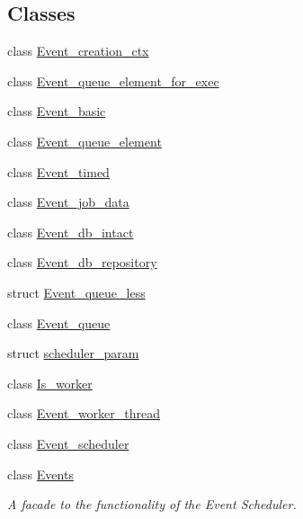 \subsection*{Classes}
\begin{DoxyCompactItemize}
\item 
class \mbox{\hyperlink{classEvent__creation__ctx}{Event\+\_\+creation\+\_\+ctx}}
\item 
class \mbox{\hyperlink{classEvent__queue__element__for__exec}{Event\+\_\+queue\+\_\+element\+\_\+for\+\_\+exec}}
\item 
class \mbox{\hyperlink{classEvent__basic}{Event\+\_\+basic}}
\item 
class \mbox{\hyperlink{classEvent__queue__element}{Event\+\_\+queue\+\_\+element}}
\item 
class \mbox{\hyperlink{classEvent__timed}{Event\+\_\+timed}}
\item 
class \mbox{\hyperlink{classEvent__job__data}{Event\+\_\+job\+\_\+data}}
\item 
class \mbox{\hyperlink{classEvent__db__intact}{Event\+\_\+db\+\_\+intact}}
\item 
class \mbox{\hyperlink{classEvent__db__repository}{Event\+\_\+db\+\_\+repository}}
\item 
struct \mbox{\hyperlink{structEvent__queue__less}{Event\+\_\+queue\+\_\+less}}
\item 
class \mbox{\hyperlink{classEvent__queue}{Event\+\_\+queue}}
\item 
struct \mbox{\hyperlink{structscheduler__param}{scheduler\+\_\+param}}
\item 
class \mbox{\hyperlink{classIs__worker}{Is\+\_\+worker}}
\item 
class \mbox{\hyperlink{classEvent__worker__thread}{Event\+\_\+worker\+\_\+thread}}
\item 
class \mbox{\hyperlink{classEvent__scheduler}{Event\+\_\+scheduler}}
\item 
class \mbox{\hyperlink{classEvents}{Events}}
\begin{DoxyCompactList}\small\item\em A facade to the functionality of the Event Scheduler. \end{DoxyCompactList}\end{DoxyCompactItemize}
